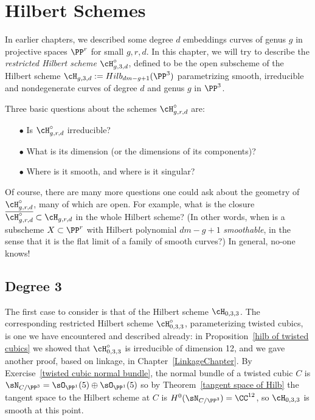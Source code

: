 

\chapter{Hilbert Schemes}
\label{HilbertSchemesChapter}

In earlier chapters, we described some  degree $d$ embeddings curves of  genus $g$ in projective spaces $\PP^r$ for small $g,r,d$. In this chapter, we will try to describe the \emph{restricted Hilbert scheme} $\cH^\circ_{g,3,d}$, defined to be the open subscheme of the Hilbert scheme $\cH_{g,3,d} := Hilb_{dm-g+1}(\PP^3)$ parametrizing smooth, irreducible and nondegenerate curves of degree $d$ and genus $g$ in $\PP^3$.

Three basic questions about the schemes $\cH^\circ_{g,r,d}$ are:

\begin{enumerate}
\item[$\bullet$] Is $\cH^\circ_{g,r,d}$ irreducible? 
\item[$\bullet$]  What is its dimension (or the dimensions of its components)?
\item[$\bullet$] Where is it smooth, and where is it singular?
\end{enumerate}

Of course, there are many more questions one could ask about the geometry of $\cH^\circ_{g,r,d}$, many of which are open. For example,  what is the closure $\overline{\cH^\circ_{g,r,d}} \subset \cH_{g,r,d}$ in the whole Hilbert scheme? (In other words, when is a subscheme $X \subset \PP^r$ with Hilbert polynomial $dm-g+1$ \emph{smoothable}, in the sense that it is the flat limit of a family of smooth curves?) In general, no-one knows!


\section{Degree 3}

The first case to consider is that of the Hilbert scheme  $\cH_{0,3,3}$. The corresponding restricted Hilbert scheme $\cH^\circ_{0,3,3}$, parameterizing twisted cubics, is one we have encountered and described already: in Proposition~\ref{hilb of twisted cubics} we showed that $\cH^\circ_{0,3,3}$ is irreducible of dimension 12,
and we gave another proof, based on linkage, in Chapter~\ref{LinkageChapter}. 
By Exercise~\ref{twisted cubic normal bundle}, the normal bundle of a twisted cubic $C$ is $\sN_{C/\PP^3}=\sO_{\PP^1}(5)\oplus \sO_{\PP^1}(5)$
so by Theorem~\ref{tangent space of Hilb} the tangent space to the Hilbert scheme at $C$ is
$H^0(\sN_{C/\PP^3}) = \CC^{12}$, so $\cH_{0,3,3}$ is smooth at this point.

